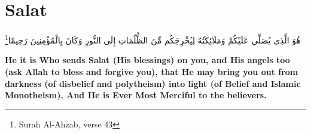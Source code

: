 \chapter{Salat}
\begin{center}
    {\Huge    
        \begin{Arabic}
            هُوَ الَّذِي يُصَلِّي عَلَيْكُمْ وَمَلَائِكَتُهُ لِيُخْرِجَكُم مِّنَ الظُّلُمَاتِ إِلَى النُّورِ وَكَانَ بِالْمُؤْمِنِينَ رَحِيمًا\footnote{Surah Al-Ahzab, verse 43}
        \end{Arabic}
    }    
\end{center}
\vspace*{\fill}
\vspace{3cm}
\begin{center}
    \Large \textbf{He it is Who sends Salat (His blessings) on you, and His angels too (ask Allah to bless and forgive you), that He may bring you out from darkness (of disbelief and polytheism) into light (of Belief and Islamic Monotheism). And He is Ever Most Merciful to the believers.}
\end{center}

